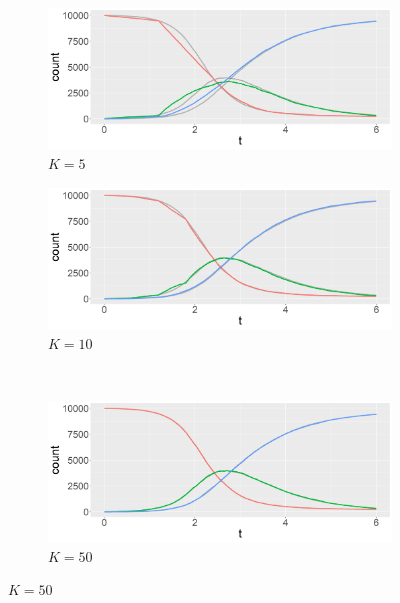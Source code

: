 \documentclass[12pt]{article}
\begin{document}
	\begin{figure}
		\begin{center}
			\begin{subfigure}[b]{0.49\textwidth}
				\centering
				\includegraphics[width=\textwidth]{E2_K5}
				\caption{$K = 5$}
				\label{fig:comparison_RD_SIR_K5}
			\end{subfigure}
			\hfill
			\begin{subfigure}[b]{0.49\textwidth}
				\centering
				\includegraphics[width=\textwidth]{E2_K10}
				\caption{$K = 10$}
				\label{fig:comparison_RD_SIR_K10}
			\end{subfigure}
			\\
			\begin{subfigure}[b]{0.49\textwidth}
				\centering
				\includegraphics[width=\textwidth]{E2_K50}
				\caption{$K = 50$}
				\label{fig:comparison_RD_SIR_K50}
			\end{subfigure}
			\hfill

\end{center}
\end{figure}
\end{document}
